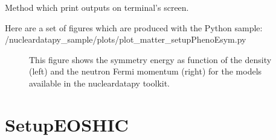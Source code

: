 \documentclass[letterpaper,10pt,english]{sphinxmanual}
\begin{document}
\begin{fulllineitems}
\begin{fulllineitems}
\end{fulllineitems}


\begin{fulllineitems}
\label{\detokenize{source/api/setup_matter_pheno_esym:nucleardatapy.matter.setup_pheno_esym.setupPhenoEsym.print_outputs}}
\pysigstartsignatures
{}
\pysigstopsignatures
\sphinxAtStartPar
Method which print outputs on terminal’s screen.

\end{fulllineitems}


\end{fulllineitems}


\sphinxAtStartPar
Here are a set of figures which are produced with the Python sample: /nucleardatapy\_sample/plots/plot\_matter\_setupPhenoEsym.py

\begin{figure}[htbp]
\centering
\capstart

\noindent{}
\caption{This figure shows the symmetry energy as function of the density (left) and the neutron Fermi momentum (right) for the models available in the nucleardatapy toolkit.}\label{\detokenize{source/api/setup_matter_pheno_esym:id1}}\end{figure}

\sphinxstepscope


\section{SetupEOSHIC}
\label{\detokenize{source/api/setup_matter_hic:setupeoshic}}\label{\detokenize{source/api/setup_matter_hic::doc}}\label{\detokenize{source/api/setup_matter_hic:module-nucleardatapy.matter.setup_hic}}
\end{document}
